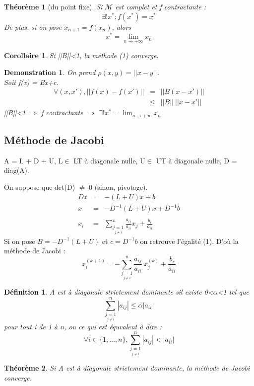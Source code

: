 \documentclass{article}
\theoremstyle{mes_theoremes}
\newtheorem*{Def}{Définition}
\newtheorem*{dem}{Demonstration}
\newtheorem*{theo}{Théorème}
\newtheorem*{coro}{Corollaire}
\begin{document}
\begin{theo}[du point fixe]
Si $\mathcal{M}$ est complet et f contractante : \[\exists! x^*; f(x^*)=x^*\]
De plus, si on pose $x_{n+1} = f(x_n)$, alors \[x^* = \lim_{n\rightarrow +\infty} x_n\]
\end{theo}

\begin{coro}
Si ||B||<1, la méthode (1) converge.
\end{coro}

\begin{dem}
On prend $\rho(x,y) = ||x-y||$. \\
Soit f(x) = Bx+c.
\begin{eqnarray*}
\forall(x,x'), ||f(x)-f(x')|| &=& ||B(x-x')|| \\
&\leq& ||B|| \ ||x-x'||
\end{eqnarray*}
||B||<1 $\Rightarrow$ f contractante $\Rightarrow$ $\exists! x^*=\lim_{n\rightarrow +\infty} x_n$
\end{dem}

\subsection{Méthode de Jacobi}
A = L + D + U, L$\in$ LT à diagonale nulle, U$\in$ UT à diagonale nulle, D = diag(A).

On suppose que det(D) $\neq$ 0 (sinon, pivotage).
\begin{eqnarray*}
Dx &=& -(L+U)x + b \\
x&=&-D^{-1}(L+U)x + D^{-1}b \\
\\
x_i &=& \sum_{\underset{j\neq i}{j=1}}^n \frac{a_{ij}}{a_{ii}}x_j + \frac{b_i}{a_{ii}}
\end{eqnarray*} 
Si on pose $B=-D^{-1}(L+U)$ et $c=D^{-1}b$ on retrouve l'égalité (1). D'où la méthode de Jacobi : 
\[x_i^{(k+1)} = -\sum_{\underset{j\neq i}{j=1}}^n \frac{a_{ij}}{a_{ii}}\ x_j^{(k)} + \frac{b_i}{a_{ii}}\]

\begin{Def}
A est à diagonale strictement dominante sil existe 0<$\alpha$<1 tel que \[\sum_{\underset{j\neq i}{j=1}}^n |a_{ij}| \leq \alpha|a_{ii}|\] pour tout i de 1 à n, ou ce qui est équvalent à dire : \[\forall i \in \{1,...,n\}, \sum_{\underset{j\neq i}{j=1}}^n |a_{ij}| < |a_{ii}| \]
\end{Def}

\begin{theo}
Si A est à diagonale strictement dominante, la méthode de Jacobi converge.
\end{theo}
\end{document}
